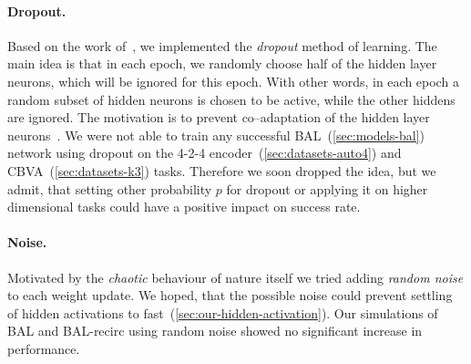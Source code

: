 


\paragraph{Dropout.}
\label{sec:sim-our-dropout}
Based on the work of~\citet{hinton2012improving}, we implemented the \emph{dropout} method of learning. The main idea is that in each epoch, we randomly choose half of the hidden layer neurons, which will be ignored for this epoch. With other words, in each epoch a random subset of hidden neurons is chosen to be active, while the other hiddens are ignored. The motivation is to prevent co--adaptation of the hidden layer neurons~\citep{hinton2012improving}. We were not able to train any successful BAL~(\ref{sec:models-bal}) network using dropout on the 4-2-4 encoder~(\ref{sec:datasets-auto4}) and CBVA~(\ref{sec:datasets-k3}) tasks. Therefore we soon dropped the idea, but we admit, that setting other probability $p$ for dropout or applying it on higher dimensional tasks could have a positive impact on success rate. 

\paragraph{Noise.} 
\label{sec:sim-our-noise} 

Motivated by the \emph{chaotic} behaviour of nature itself we tried adding \emph{random noise} to each weight update. We hoped, that the possible noise could prevent settling of hidden activations to fast~(\ref{sec:our-hidden-activation}). Our simulations of BAL and BAL-recirc using random noise showed no significant increase in performance. %

